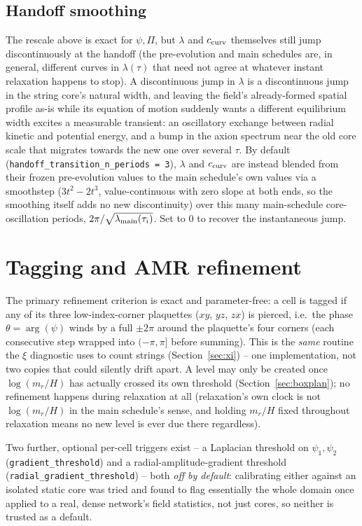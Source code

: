 \documentclass[11pt]{article}
\newcommand{\psivec}{\psi}
\begin{document}
\subsection{Handoff smoothing}
\label{sec:handoffsmoothing}
The rescale above is exact for $\psivec,\Pi$, but $\lambda$ and $c_{\rm curv}$ themselves still jump
discontinuously at the handoff (the pre-evolution and main schedules are, in general, different curves in
$\lambda(\tau)$ that need not agree at whatever instant relaxation happens to stop). A discontinuous jump in
$\lambda$ is a discontinuous jump in the string core's natural width, and leaving the field's already-formed
spatial profile as-is while its equation of motion suddenly wants a different equilibrium width excites a
measurable transient: an oscillatory exchange between radial kinetic and potential energy, and a bump in
the axion spectrum near the old core scale that migrates towards the new one over several $\tau$. By
default (\texttt{handoff\_transition\_n\_periods = 3}), $\lambda$ and $c_{\rm curv}$ are instead blended
from their frozen pre-evolution values to the main schedule's own values via a smoothstep
($3t^2-2t^3$, value-continuous with zero slope at both ends, so the smoothing itself adds no new
discontinuity) over this many main-schedule core-oscillation periods, $2\pi/\sqrt{\lambda_{\rm
main}(\tau_i)}$. Set to $0$ to recover the instantaneous jump.

\section{Tagging and AMR refinement}
\label{sec:tagging}
The primary refinement criterion is exact and parameter-free: a cell is tagged if any of its three
low-index-corner plaquettes ($xy$, $yz$, $zx$) is pierced, i.e.\ the phase $\theta=\arg(\psivec)$ winds by a
full $\pm 2\pi$ around the plaquette's four corners (each consecutive step wrapped into $(-\pi,\pi]$ before
summing). This is the \emph{same} routine the $\xi$ diagnostic uses to count strings
(Section~\ref{sec:xi}) -- one implementation, not two copies that could silently drift apart. A level may
only be created once $\log(m_r/H)$ has actually crossed its own threshold (Section~\ref{sec:boxplan}); no
refinement happens during relaxation at all (relaxation's own clock is not $\log(m_r/H)$ in the main
schedule's sense, and holding $m_r/H$ fixed throughout relaxation means no new level is ever due there
regardless).

Two further, optional per-cell triggers exist -- a Laplacian threshold on $\psivec_1,\psivec_2$
(\texttt{gradient\_threshold}) and a radial-amplitude-gradient threshold
(\texttt{radial\_\allowbreak gradient\_\allowbreak threshold}) -- both \emph{off by default}: calibrating
either against an isolated static core was tried and found to flag essentially the whole domain once
applied to a real, dense network's field statistics, not just cores, so neither is trusted as a default.
\end{document}

